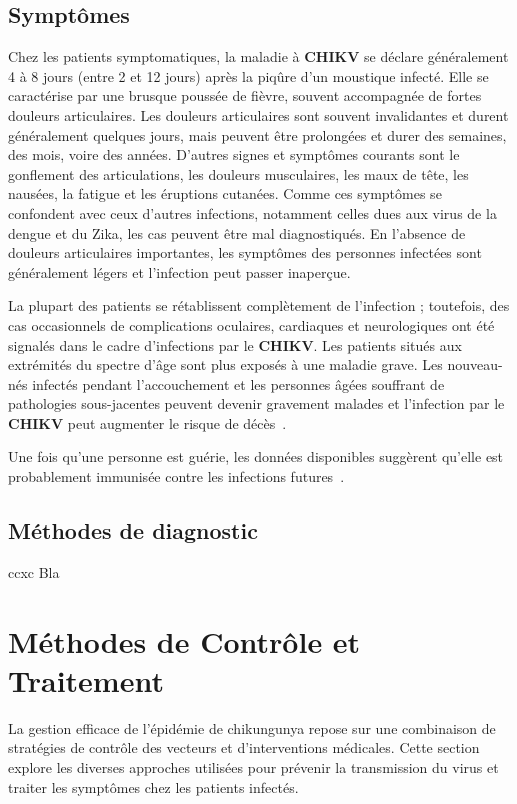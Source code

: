 \subsection{Symptômes}
Chez les patients symptomatiques, la maladie à \textbf{CHIKV} se déclare généralement 4 à 8 jours (entre 2 et 12 jours) après la piqûre d'un moustique infecté. Elle se caractérise par une brusque poussée de fièvre, souvent accompagnée de fortes douleurs articulaires. Les douleurs articulaires sont souvent invalidantes et durent généralement quelques jours, mais peuvent être prolongées et durer des semaines, des mois, voire des années. D'autres signes et symptômes courants sont le gonflement des articulations, les douleurs musculaires, les maux de tête, les nausées, la fatigue et les éruptions cutanées. Comme ces symptômes se confondent avec ceux d'autres infections, notamment celles dues aux virus de la dengue et du Zika, les cas peuvent être mal diagnostiqués. En l'absence de douleurs articulaires importantes, les symptômes des personnes infectées sont généralement légers et l'infection peut passer inaperçue.

La plupart des patients se rétablissent complètement de l'infection ; toutefois, des cas occasionnels de complications oculaires, cardiaques et neurologiques ont été signalés dans le cadre d'infections par le \textbf{CHIKV}. Les patients situés aux extrémités du spectre d'âge sont plus exposés à une maladie grave. Les nouveau-nés infectés pendant l'accouchement et les personnes âgées souffrant de pathologies sous-jacentes peuvent devenir gravement malades et l'infection par le \textbf{CHIKV} peut augmenter le risque de décès~\cite{who2}.

Une fois qu'une personne est guérie, les données disponibles suggèrent qu'elle est probablement immunisée contre les infections futures~\cite{auerswald2018broad}.

\subsection{Méthodes de diagnostic}
ccxc
Bla

\section{Méthodes de Contrôle et Traitement}

La gestion efficace de l'épidémie de chikungunya repose sur une combinaison de stratégies de contrôle des vecteurs et d'interventions médicales. Cette section explore les diverses approches utilisées pour prévenir la transmission du virus et traiter les symptômes chez les patients infectés.

